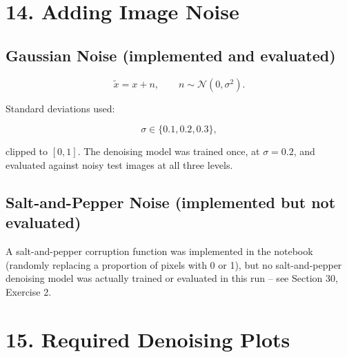 \documentclass[10pt]{article}
\begin{document}
\begin{center}
\end{center}

\section*{14. Adding Image Noise}

\subsection*{Gaussian Noise (implemented and evaluated)}

\[
\tilde{x}=x+n,
\qquad
n\sim\mathcal{N}(0,\sigma^2).
\]

Standard deviations used:

\[
\sigma\in\{0.1,0.2,0.3\},
\]

clipped to $[0,1]$. The denoising model was trained once, at
$\sigma=0.2$, and evaluated against noisy test images at all three levels.

\subsection*{Salt-and-Pepper Noise (implemented but not evaluated)}

A salt-and-pepper corruption function was implemented in the notebook
(randomly replacing a proportion of pixels with 0 or 1), but no
salt-and-pepper denoising model was actually trained or evaluated in this
run -- see Section 30, Exercise 2.

\section*{15. Required Denoising Plots}
\end{document}
